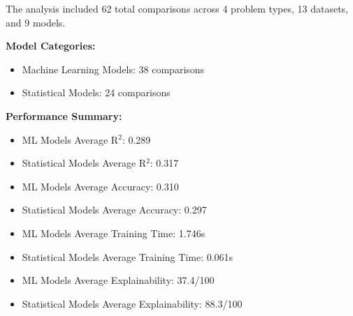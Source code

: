 \documentclass[11pt,a4paper]{article}
\begin{document}
The analysis included 62 total comparisons across 4 problem types, 13 datasets, and 9 models.

\textbf{Model Categories:}
\begin{itemize}
\item Machine Learning Models: 38 comparisons
\item Statistical Models: 24 comparisons
\end{itemize}

\textbf{Performance Summary:}
\begin{itemize}
\item ML Models Average R$^2$: 0.289
\item Statistical Models Average R$^2$: 0.317
\item ML Models Average Accuracy: 0.310
\item Statistical Models Average Accuracy: 0.297
\item ML Models Average Training Time: 1.746s
\item Statistical Models Average Training Time: 0.061s
\item ML Models Average Explainability: 37.4/100
\item Statistical Models Average Explainability: 88.3/100
\end{itemize}
\end{document}
